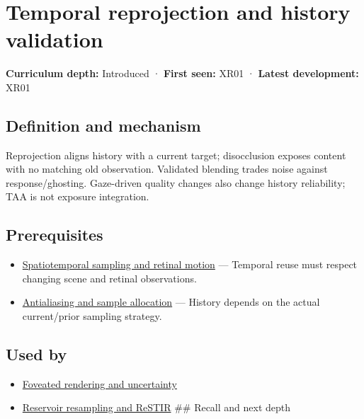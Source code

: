 \hypertarget{appendix-0727340a4428}{}\label{referencestart:appendix-0727340a4428}
\section{Temporal reprojection and history validation}\label{appendix-0727340a4428-temporal-reprojection-and-history-validation}

\textbf{Curriculum depth:} Introduced · \textbf{First seen:} XR01 · \textbf{Latest development:} XR01

\subsection{Definition and mechanism}\label{appendix-0727340a4428-definition-and-mechanism}

Reprojection aligns history with a current target; disocclusion exposes content with no matching old observation. Validated blending trades noise against response/ghosting. Gaze-driven quality changes also change history reliability; TAA is not exposure integration.

\subsection{Prerequisites}\label{appendix-0727340a4428-prerequisites}

\begin{itemize}
\tightlist
\item
  \hyperref[appendix-70895739febb]{Spatiotemporal sampling and retinal motion} --- Temporal reuse must respect changing scene and retinal observations.
\item
  \hyperref[appendix-4192b2bdd21e]{Antialiasing and sample allocation} --- History depends on the actual current/prior sampling strategy.
\end{itemize}

\subsection{Used by}\label{appendix-0727340a4428-used-by}

\begin{itemize}
\item
  \hyperref[appendix-5878b813b732]{Foveated rendering and uncertainty}
\item
  \hyperref[appendix-68be451b78b1]{Reservoir resampling and ReSTIR} \#\# Recall and next depth
\end{itemize}

